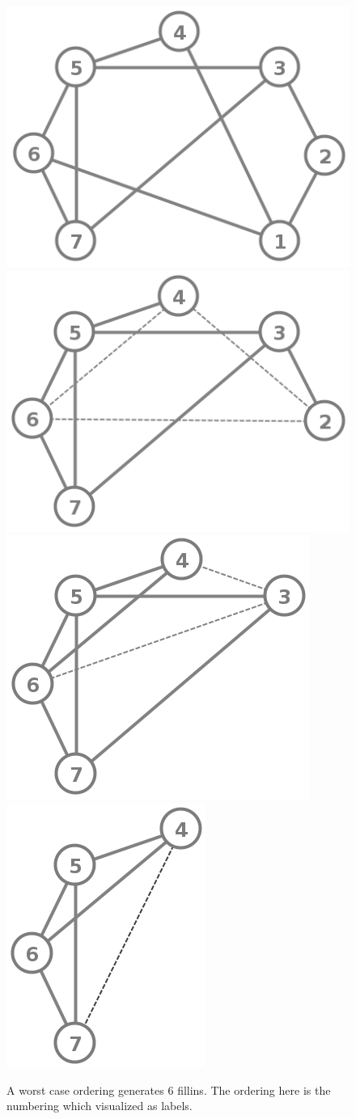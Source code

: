 \documentclass[12pt, oneside]{book}
\begin{document}

\begin{figure}
\centering
   \includegraphics[width=0.4\linewidth]{bad_order}
   \hfill
   \includegraphics[width=0.4\linewidth]{bad_order_1_removed}
   \includegraphics[width=0.4\linewidth]{bad_order_2_1_removed}
   \hfill
   \includegraphics[width=0.3\linewidth]{bad_order_3_2_1_removed}
\caption{A worst case ordering generates $6$ fillins. The ordering here is the 
numbering which visualized as labels.}
\label{bad_order_fillin}
\end{figure}
\end{document}
